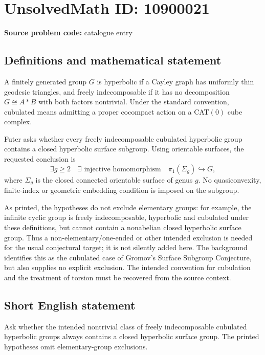\documentclass[11pt]{article}
\begin{document}
\section*{UnsolvedMath ID: 10900021}
\textbf{Source problem code:} catalogue entry
\subsection{Definitions and mathematical statement}
A finitely generated group \(G\) is hyperbolic if a Cayley graph has uniformly thin geodesic triangles, and freely indecomposable if it has no decomposition \(G\cong A*B\) with both factors nontrivial. Under the standard convention, cubulated means admitting a proper cocompact action on a CAT\((0)\) cube complex.

Futer asks whether every freely indecomposable cubulated hyperbolic group contains a closed hyperbolic surface subgroup. Using orientable surfaces, the requested conclusion is
\[
 \exists g\geq2\quad\exists\text{ injective homomorphism}
 \quad\pi_1(\Sigma_g)\hookrightarrow G,
\]
where \(\Sigma_g\) is the closed connected orientable surface of genus \(g\). No quasiconvexity, finite-index or geometric embedding condition is imposed on the subgroup.

As printed, the hypotheses do not exclude elementary groups: for example, the infinite cyclic group is freely indecomposable, hyperbolic and cubulated under these definitions, but cannot contain a nonabelian closed hyperbolic surface group. Thus a non-elementary/one-ended or other intended exclusion is needed for the usual conjectural target; it is not silently added here. The background identifies this as the cubulated case of Gromov's Surface Subgroup Conjecture, but also supplies no explicit exclusion. The intended convention for cubulation and the treatment of torsion must be recovered from the source context.
\subsection{Short English statement}
Ask whether the intended nontrivial class of freely indecomposable cubulated hyperbolic groups always contains a closed hyperbolic surface group. The printed hypotheses omit elementary-group exclusions.
\end{document}
